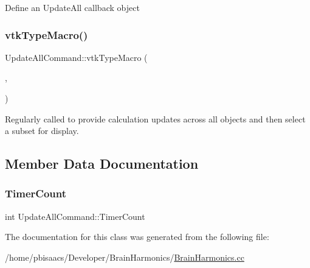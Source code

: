 Define an Update\+All callback object\mbox{\label{classUpdateAllCommand_a228565b2a2306d425dc7eb3cda4d39a4}} 
\subsubsection{\texorpdfstring{vtk\+Type\+Macro()}{vtkTypeMacro()}}
{\footnotesize\ttfamily Update\+All\+Command\+::vtk\+Type\+Macro (\begin{DoxyParamCaption}\item[{\mbox{\hyperlink{classUpdateAllCommand}{Update\+All\+Command}}}]{,  }\item[{vtk\+Command}]{ }\end{DoxyParamCaption})}

Regularly called to provide calculation updates across all objects and then select a subset for display. 

\subsection{Member Data Documentation}
\mbox{\label{classUpdateAllCommand_a66ba9400072105306ca48a58470014dc}} 
\subsubsection{\texorpdfstring{Timer\+Count}{TimerCount}}
{\footnotesize\ttfamily int Update\+All\+Command\+::\+Timer\+Count\hspace{0.3cm}{\ttfamily [private]}}



The documentation for this class was generated from the following file\+:\begin{DoxyCompactItemize}
\item 
/home/pbisaacs/\+Developer/\+Brain\+Harmonics/\mbox{\hyperlink{BrainHarmonics_8cc}{Brain\+Harmonics.\+cc}}\end{DoxyCompactItemize}

